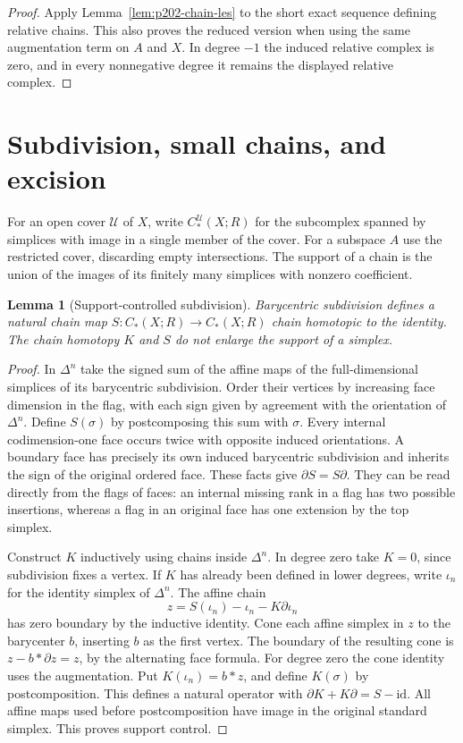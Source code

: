 \documentclass[11pt,oneside,openany]{book}
\theoremstyle{plain}
\newtheorem{lemma}[theorem]{Lemma}
\theoremstyle{definition}
\theoremstyle{remark}
\begin{document}
\begin{proof}
Apply Lemma~\ref{lem:p202-chain-les} to the short exact
sequence defining relative chains. This also proves the
reduced version when using the same augmentation term
on \(A\) and \(X\). In degree \(-1\) the induced
relative complex is zero, and in every nonnegative
degree it remains the displayed relative complex.
\end{proof}

\section{Subdivision, small chains, and excision}\label{p202:T17}

For an open cover \(\mathcal U\) of \(X\), write
\(C_*^{\mathcal U}(X;R)\) for the subcomplex spanned by
simplices with image in a single member of the cover.
For a subspace \(A\) use the restricted cover, discarding
empty intersections. The support of a chain is the union
of the images of its finitely many simplices with nonzero
coefficient.

\begin{lemma}[Support-controlled subdivision]
\label{lem:p202-subdivision}
Barycentric subdivision defines a natural chain map
\(S:C_*(X;R)\to C_*(X;R)\) chain homotopic to the identity.
The chain homotopy \(K\) and \(S\) do not enlarge the
support of a simplex.
\end{lemma}

\begin{proof}
In \(\Delta^n\) take the signed sum of the affine maps
of the full-dimensional simplices of its barycentric
subdivision. Order their vertices by increasing face
dimension in the flag, with each sign given by agreement
with the orientation of \(\Delta^n\). Define \(S(\sigma)\) by
postcomposing this sum with \(\sigma\).
Every internal codimension-one face occurs twice with
opposite induced orientations. A boundary face has
precisely its own induced barycentric subdivision and
inherits the sign of the original ordered face.
These facts give \(\partial S=S\partial\).
They can be read directly from the flags of faces:
an internal missing rank in a flag has two possible
insertions, whereas a flag in an original face has one
extension by the top simplex.

Construct \(K\) inductively using chains inside
\(\Delta^n\). In degree zero take \(K=0\), since
subdivision fixes a vertex. If \(K\) has already been
defined in lower degrees, write \(\iota_n\) for the
identity simplex of \(\Delta^n\). The affine chain
\[
 z=S(\iota_n)-\iota_n-K\partial\iota_n
\]
has zero boundary by the inductive identity. Cone each
affine simplex in \(z\) to the barycenter \(b\), inserting
\(b\) as the first vertex. The boundary of the resulting
cone is \(z-b*\partial z=z\), by the alternating face
formula. For degree zero the cone identity uses the
augmentation. Put \(K(\iota_n)=b*z\), and define
\(K(\sigma)\) by postcomposition. This defines a natural
operator with \(\partial K+K\partial=S-\mathrm{id}\).
All affine maps used before postcomposition have image in
the original standard simplex. This proves support control.
\end{proof}
\end{document}
